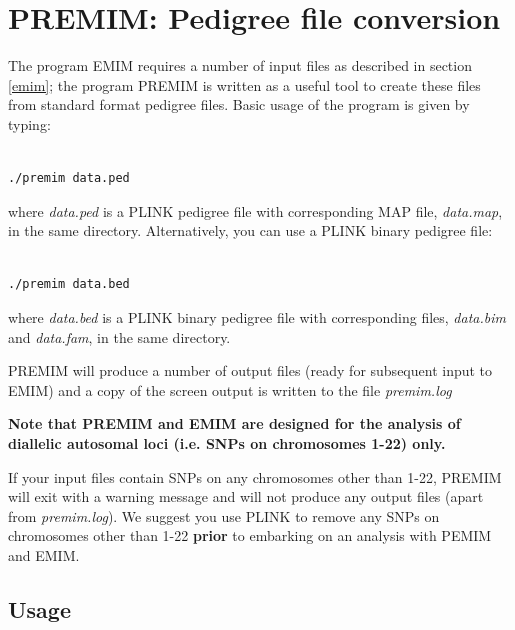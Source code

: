 \documentclass[a4paper,12pt]{article}
\begin{document}



\section{PREMIM: Pedigree file conversion}
\label{premim}

The program EMIM requires a number of input files as described in  section \ref{emim}; the program PREMIM is written as a useful tool to create these files from standard format pedigree files. Basic usage of the program is given by typing: 
\vspace{0.35cm} \begin{lstlisting}

./premim data.ped

\end{lstlisting} \vspace{0.35cm}
where {\it data.ped} is a PLINK pedigree file with corresponding MAP file, {\it data.map}, in the same directory. Alternatively, you can use a PLINK binary pedigree file: 
\vspace{0.35cm} \begin{lstlisting}

./premim data.bed

\end{lstlisting} \vspace{0.35cm}
where {\it data.bed} is a PLINK binary pedigree file with corresponding files, {\it data.bim} and {\it data.fam}, in the same directory. 

PREMIM will produce a number of output files (ready for subsequent input to EMIM) and a copy of the screen output is written to the file {\it premim.log} 

{\bf Note that PREMIM and EMIM are designed for the analysis of diallelic autosomal loci (i.e. SNPs on chromosomes 1-22) only.} 

If your input files contain SNPs on any chromosomes other than 1-22, PREMIM will exit with a warning message and will not produce any output files (apart from {\it premim.log}). We suggest you use PLINK to remove any SNPs on chromosomes other than 1-22 {\bf prior} to embarking on an analysis with PEMIM and EMIM. 
\subsection{Usage}
\label{premim-usage}
\end{document}
